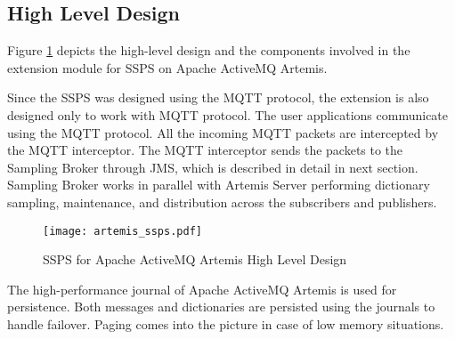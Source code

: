 \subsection{High Level Design}

Figure \ref{figures:artemis_ssps} depicts the high-level design and the components involved in the extension module for SSPS on Apache ActiveMQ Artemis. 

Since the SSPS was designed using the MQTT protocol, the extension is also designed only to work with MQTT protocol. The user applications communicate using the MQTT protocol. All the incoming MQTT packets are intercepted by the MQTT interceptor. The MQTT interceptor sends the packets to the Sampling Broker through JMS, which is described in detail in next section. Sampling Broker works in parallel with Artemis Server performing dictionary sampling, maintenance, and distribution across the subscribers and publishers. 
\makeatletter
\setlength{\intextsep}{20pt}
\makeatother

\begin{figure}[h!]
\centering
\texttt{[image: artemis\_ssps.pdf]}
\caption{SSPS for Apache ActiveMQ Artemis High Level Design}\label{figures:artemis_ssps}
\end{figure}

The high-performance journal of Apache ActiveMQ Artemis is used for persistence. Both messages and dictionaries are persisted using the journals to handle failover. Paging comes into the picture in case of low memory situations.
